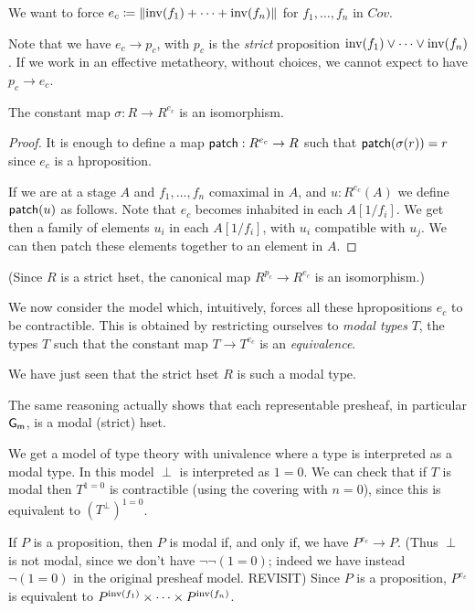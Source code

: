 We want to force $e_c \coloneqq \left\lVert \mathrm{inv}(f_1)+\dots+\mathrm{inv}(f_n) \right\rVert$ for $f_1,\dots,f_n$ in $Cov$.

Note that we have $e_c\rightarrow p_c$, with $p_c$ is the {\em strict} proposition $\mathrm{inv}(f_1)\vee \dots\vee\mathrm{inv}(f_n)$.
If we work in an effective metatheory, without choices, we cannot expect to have $p_c\rightarrow e_c$.

\begin{lemma}
  The constant map $\sigma:R\rightarrow R^{e_c}$ is an isomorphism.
\end{lemma}

\begin{proof}
  It is enough to define a map $\mathsf{patch}:R^{e_c}\rightarrow R$ such that $\mathsf{patch}(\sigma(r)) = r$ since
  $e_c$ is a hproposition.

  If we are at a stage $A$ and $f_1,\dots,f_n$ comaximal in $A$, and $u:R^{e_c}(A)$ we define $\mathsf{patch}(u)$ as follows.
  Note that $e_c$ becomes inhabited in each $A[1/f_i]$. We get then a family of elements $u_i$ in each $A[1/f_i]$, with $u_i$ compatible
  with $u_j$. We can then patch these elements together to an element in $A$.
\end{proof}

(Since $R$ is a strict hset, the canonical map $R^{p_c}\rightarrow R^{e_c}$ is an isomorphism.)

We now consider the model which, intuitively, forces all these hpropositions $e_c$ to be contractible.
This is obtained by restricting ourselves to {\em modal types} $T$, the types
$T$ such that the constant map $T\rightarrow T^{e_c}$ is an {\em equivalence}.

\medskip

We have just seen that the strict hset $R$ is such a modal type.

The same reasoning actually shows that each representable presheaf, in particular $\mathsf{G_m}$, is a modal
(strict) hset.

\medskip

We get a model of type theory with univalence where a type is interpreted as a modal type.
In this model $\perp$ is interpreted as $1=0$. We can check that if $T$ is modal then
$T^{1=0}$ is contractible (using the covering with $n=0$), since this is equivalent to $(T^{\perp})^{1=0}$.

\medskip

If $P$ is a proposition, then $P$ is modal if, and only if,
we have $P^{e_c}\rightarrow P$.
(Thus $\perp$ is not modal, since we don't have $\neg\neg(1=0)$; indeed we have instead $\neg(1=0)$ in
the original presheaf model.
{\color{red} REVISIT})
Since $P$ is a
proposition, $P^{e_c}$ is equivalent to $P^{\mathrm{inv}(f_1)}\times \dots\times P^{\mathrm{inv}(f_n)}$.


